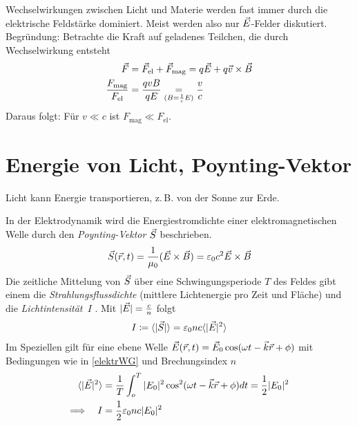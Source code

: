 Wechselwirkungen zwischen Licht und Materie werden fast immer durch
die elektrische Feldstärke dominiert. Meist werden also nur
$\vec{E}$-Felder diskutiert. Begründung: Betrachte die Kraft auf
geladenes Teilchen, die durch Wechselwirkung entsteht
\begin{align*}
  \vec{F}
  &=\vec{F}_\text{el}+\vec{F}_\text{mag}=q\vec{E} +q\vec{v}\times\vec{B}\\
  \frac{F_\text{mag}}{F_\text{el}}
  &=\frac{qvB}{qE}
    \underset{(B=\frac{1}{c}E)}{=}\frac{v}{c}
\end{align*}%
%
%
Daraus folgt: Für $v\ll c$ ist  $F_\text{mag}\ll F_\text{el}$.

\section{Energie von Licht, Poynting-Vektor}
Licht kann Energie transportieren, z.\,B. von der Sonne zur Erde.

In der Elektrodynamik wird die Energiestromdichte einer
elektromagnetischen Welle durch den 
\emph{Poynting-Vektor} $\vec{S}$%
%
beschrieben.
\begin{align*}
	\vec{S}(\vec{r},t)=\frac{1}{\mu_0}(\vec{E}\times\vec{B})=\varepsilon_0 c^2 \vec{E}\times\vec{B}
\end{align*}
Die zeitliche Mittelung von $\vec{S}$ über eine Schwingungsperiode $T$ des
Feldes gibt einem die
\emph{Strahlungsflussdichte} 
(mittlere Lichtenergie pro Zeit und Fläche) 
und die \emph{Lichtintensität~$I$}%
%
.
Mit $\vert\vec{E}\vert = \frac{c}{n}$ folgt
\begin{gather*}
  I \coloneqq \langle|\vec{S}|\rangle
  =\varepsilon_0 nc \langle|\vec{E}|^2\rangle
\end{gather*}
Im Speziellen gilt für eine ebene Welle
$\vec{E}(\vec{r},t)= \vec{E}_0 \cos(\omega t -\vec{k}\vec{r}+\phi)$
mit Bedingungen wie in \eqref{elektrWG} und Brechungsindex $n$
\begin{align*}
  \langle\vert\vec{E}\vert^2\rangle
  &=\frac{1}{T}\int_{o}^{T} \vert E_0\vert^2 
  \cos^2( \omega t-\vec{k}\vec{r}+\phi )dt
  =\frac{1}{2}\vert E_0\vert^2\\
  \Longrightarrow\quad I&=\frac{1}{2}\varepsilon_0 n c \vert E_0\vert^2
\end{align*}


